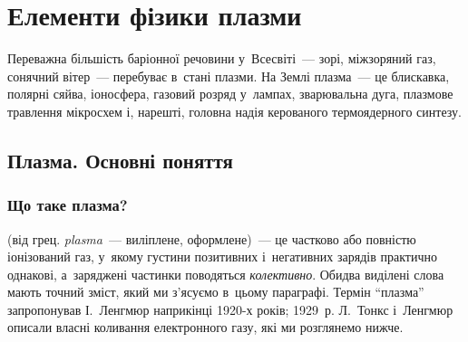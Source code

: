 


\chapter{Елементи фізики плазми}\label{\currfilebase}\hypertarget{PlasmaPhysics}{}
\graphicspath{{\currfilebase/Pictures}}

\providecommand{\figstub}[2][0.6]{%
	\fbox{\parbox[c][3.4cm][c]{\dimexpr#1\linewidth-2\fboxsep-2\fboxrule\relax}{\centering\small\itshape
			#2}}}

Переважна більшість баріонної речовини у~Всесвіті~--- зорі, міжзоряний газ, сонячний
вітер~--- перебуває в~стані плазми. На Землі плазма~--- це блискавка, полярні сяйва,
іоносфера, газовий розряд у~лампах, зварювальна дуга, плазмове травлення мікросхем і,
нарешті, головна надія керованого термоядерного синтезу.



\section{Плазма. Основні поняття}\label{sec:plasma-basics}\hypertarget{plasma-basics}{}



\subsection*{Що таке плазма?}



 (від грец. \emph{plasma}~--- виліплене, оформлене)~--- це частково або
повністю іонізований газ, у~якому густини позитивних і~негативних зарядів практично
однакові, а~заряджені частинки поводяться \emph{колективно}. Обидва виділені слова мають
точний зміст, який ми з'ясуємо в~цьому параграфі. Термін \enquote{плазма} запропонував
І.~Ленгмюр наприкінці 1920-х років; 1929~р. Л.~Тонкс і~Ленгмюр описали власні коливання
електронного газу, які ми розглянемо нижче.

